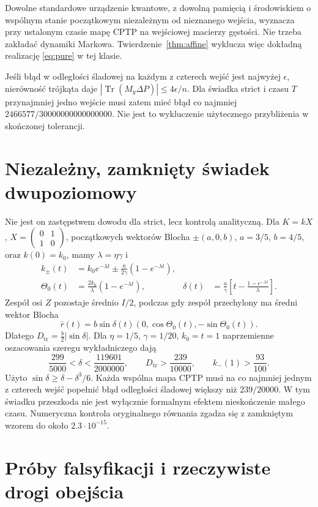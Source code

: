 \documentclass[11pt,a4paper]{article}
\newcommand{\Tr}{\operatorname{Tr}}
\newcommand{\Dtr}{D_{\mathrm{tr}}}
\begin{document}
Dowolne standardowe urządzenie kwantowe, z dowolną pamięcią i środowiskiem
o wspólnym stanie początkowym niezależnym od nieznanego wejścia,
wyznacza przy ustalonym czasie mapę CPTP na wejściowej macierzy gęstości.
Nie trzeba zakładać dynamiki Markowa. Twierdzenie~\ref{thm:affine}
wyklucza więc dokładną realizację \eqref{eq:pure} w tej klasie.

Jeśli błąd w odległości śladowej na każdym z czterech wejść jest najwyżej
$\epsilon$, nierówność trójkąta daje
$|\Tr(M_y\Delta P)|\le4\epsilon/n$.
Dla świadka strict i czasu $T$ przynajmniej jedno wejście musi zatem
mieć błąd co najmniej $2466577/30000000000000000$.
Nie jest to wykluczenie użytecznego przybliżenia w skończonej tolerancji.

\section{Niezależny, zamknięty świadek dwupoziomowy}

Nie jest on zastępstwem dowodu dla strict, lecz kontrolą analityczną.
Dla $K=kX$, $X=\left(\begin{smallmatrix}0&1\\1&0\end{smallmatrix}\right)$,
początkowych wektorów Blocha $\pm(a,0,b)$, $a=3/5$, $b=4/5$,
oraz $k(0)=k_0$, mamy $\lambda=\eta\gamma$ i
\begin{align}
 k_\pm(t)&=k_0e^{-\lambda t}\pm\frac{a}{2\gamma}(1-e^{-\lambda t}),\\
 \Theta_0(t)&=\frac{2k_0}{\lambda}(1-e^{-\lambda t}),&
 \delta(t)&=\frac a\gamma\left[t-\frac{1-e^{-\lambda t}}\lambda\right].
\end{align}
Zespół osi $Z$ pozostaje średnio $I/2$, podczas gdy zespół przechylony ma
średni wektor Blocha
\[
 \bar r(t)=b\sin\delta(t)(0,\cos\Theta_0(t),-\sin\Theta_0(t)).
\]
Dlatego $\Dtr=\tfrac b2|\sin\delta|$. Dla $\eta=1/5$, $\gamma=1/20$,
$k_0=t=1$ naprzemienne oszacowania szeregu wykładniczego dają
\[
 \frac{299}{5000}<\delta<\frac{119601}{2000000},\qquad
 \Dtr>\frac{239}{10000},\qquad k_-(1)>\frac{93}{100}.
\]
Użyto $\sin\delta\ge\delta-\delta^3/6$. Każda wspólna mapa CPTP musi
na co najmniej jednym z czterech wejść popełnić błąd odległości śladowej
większy niż $239/20000$. W tym świadku przeszkoda nie jest wyłącznie
formalnym efektem nieskończenie małego czasu. Numeryczna kontrola
oryginalnego równania zgadza się z zamkniętym wzorem do około $2.3\cdot10^{-15}$.

\section{Próby falsyfikacji i rzeczywiste drogi obejścia}
\end{document}
